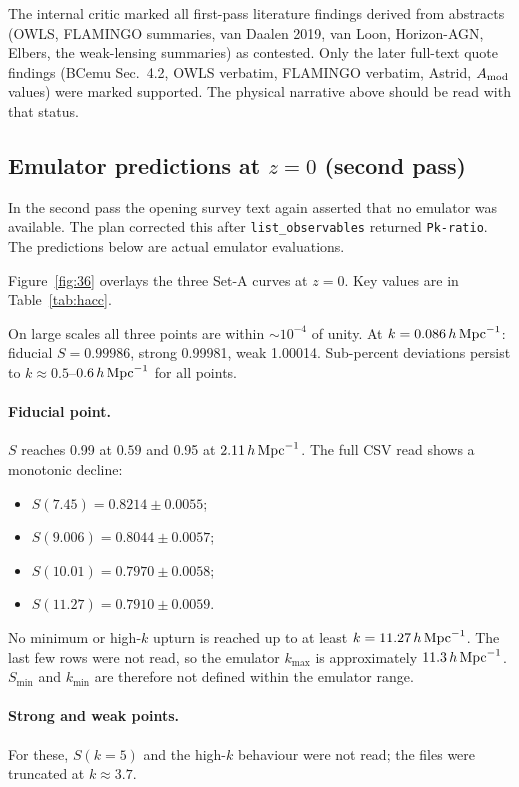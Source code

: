 \documentclass[11pt,a4paper]{article}
\begin{document}
The internal critic marked all first-pass literature findings derived from abstracts (OWLS, FLAMINGO summaries, van Daalen 2019, van Loon, Horizon-AGN, Elbers, the weak-lensing summaries) as contested. Only the later full-text quote findings (BCemu Sec.~4.2, OWLS verbatim, FLAMINGO verbatim, Astrid, $A_{\rm mod}$ values) were marked supported. The physical narrative above should be read with that status.

\subsection{Emulator predictions at $z=0$ (second pass)}
In the second pass the opening survey text again asserted that no emulator was available. The plan corrected this after \texttt{list\_observables} returned \texttt{Pk-ratio}. The predictions below are actual emulator evaluations.






Figure~\ref{fig:36} overlays the three Set-A curves at $z=0$. Key values are in Table~\ref{tab:hacc}.

On large scales all three points are within $\sim10^{-4}$ of unity. At $k=0.086\,h\,{\rm Mpc}^{-1}$: fiducial $S=0.99986$, strong 0.99981, weak 1.00014. Sub-percent deviations persist to $k\approx0.5$--$0.6\,h\,{\rm Mpc}^{-1}$ for all points.

\paragraph{Fiducial point.} $S$ reaches 0.99 at $0.59$ and 0.95 at $2.11\,h\,{\rm Mpc}^{-1}$. The full CSV read shows a monotonic decline:
\begin{itemize}
\item $S(7.45)=0.8214\pm0.0055$;
\item $S(9.006)=0.8044\pm0.0057$;
\item $S(10.01)=0.7970\pm0.0058$;
\item $S(11.27)=0.7910\pm0.0059$.
\end{itemize}
No minimum or high-$k$ upturn is reached up to at least $k=11.27\,h\,{\rm Mpc}^{-1}$. The last few rows were not read, so the emulator $k_{\max}$ is approximately $11.3\,h\,{\rm Mpc}^{-1}$. $S_{\min}$ and $k_{\min}$ are therefore not defined within the emulator range.

\paragraph{Strong and weak points.} For these, $S(k=5)$ and the high-$k$ behaviour were not read; the files were truncated at $k\approx3.7$.
\end{document}
